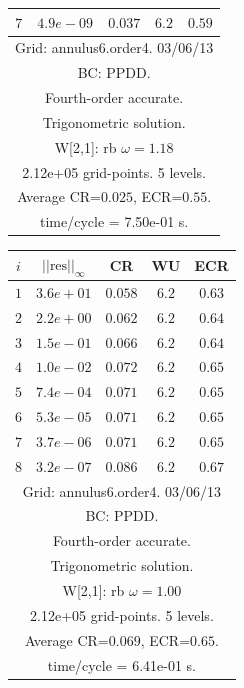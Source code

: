 \begin{table}[hbt]
\begin{center}
{\begin{tabular}{|c|c|c|c|c|}
 $ 7$  & $ 4.9e-09$ & $0.037$ & $ 6.2$ & $0.59$ \\ 
\hline 
\multicolumn{5}{|c|}{Grid: annulus6.order4. 03/06/13}  \\
\multicolumn{5}{|c|}{BC: PPDD.}  \\
\multicolumn{5}{|c|}{Fourth-order accurate.}  \\
\multicolumn{5}{|c|}{Trigonometric solution.}  \\
\multicolumn{5}{|c|}{W[2,1]: rb $\omega=1.18$}  \\
\multicolumn{5}{|c|}{2.12e+05 grid-points. 5 levels.}  \\
\multicolumn{5}{|c|}{Average CR=$0.025$, ECR=$0.55$.}  \\
\multicolumn{5}{|c|}{time/cycle = 7.50e-01 s.}  \\
\hline 
\end{tabular}
\begin{tabular}{|c|c|c|c|c|} \hline 
 $i$   & $\vert\vert\mbox{res}\vert\vert_\infty$  &  CR     &  WU    & ECR  \\   \hline 
 $ 1$  & $ 3.6e+01$ & $0.058$ & $ 6.2$ & $0.63$ \\ 
 $ 2$  & $ 2.2e+00$ & $0.062$ & $ 6.2$ & $0.64$ \\ 
 $ 3$  & $ 1.5e-01$ & $0.066$ & $ 6.2$ & $0.64$ \\ 
 $ 4$  & $ 1.0e-02$ & $0.072$ & $ 6.2$ & $0.65$ \\ 
 $ 5$  & $ 7.4e-04$ & $0.071$ & $ 6.2$ & $0.65$ \\ 
 $ 6$  & $ 5.3e-05$ & $0.071$ & $ 6.2$ & $0.65$ \\ 
 $ 7$  & $ 3.7e-06$ & $0.071$ & $ 6.2$ & $0.65$ \\ 
 $ 8$  & $ 3.2e-07$ & $0.086$ & $ 6.2$ & $0.67$ \\ 
\hline 
\multicolumn{5}{|c|}{Grid: annulus6.order4. 03/06/13}  \\
\multicolumn{5}{|c|}{BC: PPDD.}  \\
\multicolumn{5}{|c|}{Fourth-order accurate.}  \\
\multicolumn{5}{|c|}{Trigonometric solution.}  \\
\multicolumn{5}{|c|}{W[2,1]: rb $\omega=1.00$}  \\
\multicolumn{5}{|c|}{2.12e+05 grid-points. 5 levels.}  \\
\multicolumn{5}{|c|}{Average CR=$0.069$, ECR=$0.65$.}  \\
\multicolumn{5}{|c|}{time/cycle = 6.41e-01 s.}  \\
\hline 
\end{tabular}
}
\end{center}
\end{table}
